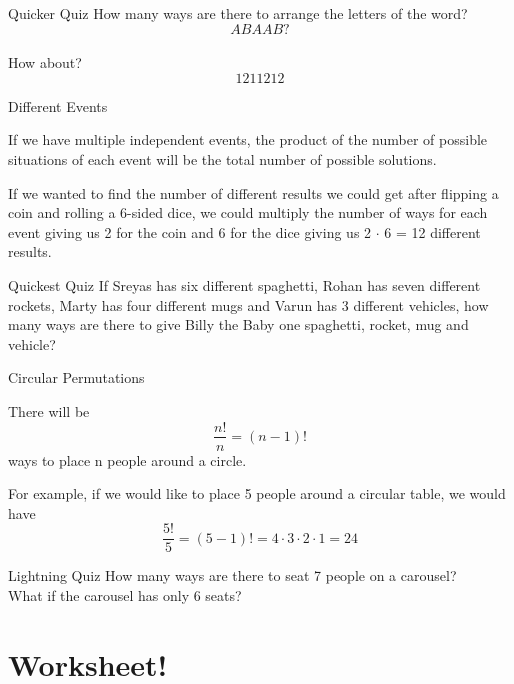\documentclass[aspectratio=169,xcolor=dvipsnames]{beamer}
\begin{document}
\begin{frame}[t]{Quicker Quiz}
    How many ways are there to arrange the letters of the word?
    \[ABAAB?\]\\
    \vspace{1.5cm}
    How about?
    \[1211212\]
\end{frame}
\begin{frame}[t]{Different Events}
    \begin{definition}
        If we have multiple independent events, the product of the number of possible situations of each event will be the total number of possible solutions.
    \end{definition}
    \vspace{3cm}
    If we wanted to find the number of different results we could get after flipping a coin and rolling a 6-sided dice, we could multiply the number of ways for each event giving us 2 for the coin and 6 for the dice giving us 2 $\cdot$ 6 = 12 different results.
\end{frame}
\begin{frame}[t]{Quickest Quiz}
    If Sreyas has six different spaghetti, Rohan has seven different rockets, Marty has four different mugs and Varun has 3 different vehicles, how many ways are there to give Billy the Baby one spaghetti, rocket, mug and vehicle?
\end{frame}
\begin{frame}[t]{Circular Permutations}
    \begin{definition}
        There will be \[
        \frac{n!}{n} = (n-1)!
        \]
        ways to place n people around a circle.
        
    \end{definition}
    \vspace{2.5cm}
    For example, if we would like to place 5 people around a circular table, we would have \[\frac{5!}{5} = (5-1)! = 4 \cdot 3 \cdot 2 \cdot 1 = 24\]

\end{frame}
\begin{frame}[t]{Lightning Quiz}
    How many ways are there to seat 7 people on a carousel? \\
    \vspace{2.5cm}
    What if the carousel has only 6 seats?
\end{frame}
\section{Worksheet!}
\end{document}
